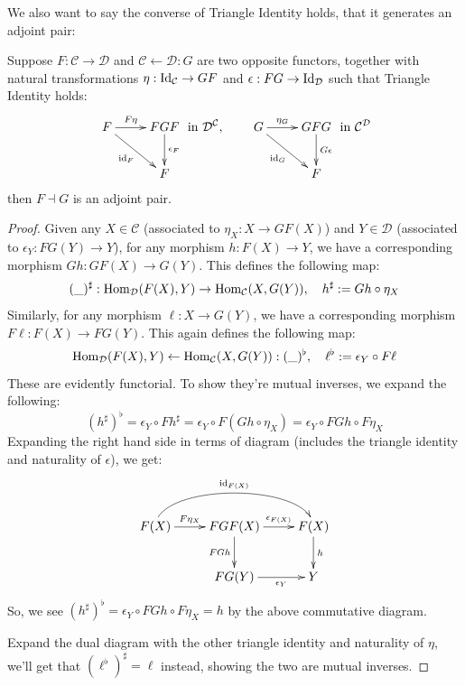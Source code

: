 \documentclass{article}
\begin{document}
We also want to say the converse of Triangle Identity holds, that it generates an adjoint pair:
\begin{lem}
    Suppose $F:\mathcal{C}\rightarrow \mathcal{D}$ and $\mathcal{C}\leftarrow \mathcal{D}:G$ are two opposite functors, together with natural transformations $\eta:\mathrm{Id}_\mathcal{C}\rightarrow GF$ and $\epsilon:FG\rightarrow \mathrm{Id}_\mathcal{D}$ such that Triangle Identity holds:
    \[\xymatrix{
        F \ar[r]^-{F\eta} \ar[dr]_-{\id_F} & FGF \ar[d]^-{\epsilon_F}\\
        & F
    } \text{ in }\mathcal{D}^\mathcal{C},\quad \quad \xymatrix{
        G \ar[r]^-{\eta_G} \ar[dr]_-{\id_G} & GFG \ar[d]^-{G\epsilon}\\
        & F
    } \text{ in }\mathcal{C}^\mathcal{D}\]
    then $F\dashv G$ is an adjoint pair.
\end{lem}
\begin{proof}
    Given any $X\in \mathcal{C}$ (associated to $\eta_X:X\rightarrow GF(X)$) and $Y\in\mathcal{D}$ (associated to $\epsilon_Y:FG(Y)\rightarrow Y$), for any morphism $h:F(X)\rightarrow Y$, we have a corresponding morphism $Gh:GF(X)\rightarrow G(Y)$. This defines the following map:
    \[(\_)^\sharp:\mathrm{Hom}_\mathcal{D}(F(X),Y)\rightarrow \mathrm{Hom}_\mathcal{C}(X,G(Y)),\quad h^\sharp := Gh\circ \eta_X\]
    Similarly, for any morphism $\ell:X\rightarrow G(Y)$, we have a corresponding morphism $F\ell:F(X)\rightarrow FG(Y)$. This again defines the following map:
    \[\mathrm{Hom}_\mathcal{D}(F(X),Y)\leftarrow \mathrm{Hom}_\mathcal{C}(X,G(Y)):(\_)^\flat,\quad \ell^\flat := \epsilon_Y\circ F\ell\]
    These are evidently functorial. To show they're mutual inverses, we expand the following:
    \[(h^\sharp)^\flat = \epsilon_Y\circ Fh^\sharp = \epsilon_Y\circ F(Gh\circ \eta_X) = \epsilon_Y \circ FGh\circ F\eta_X\]
    Expanding the right hand side in terms of diagram (includes the triangle identity and naturality of $\epsilon$), we get:
    \[\xymatrix{
        F(X) \ar@(u,u)[rr]^-{\id_{F(X)}} \ar[r]^-{F\eta_X} & FGF(X) \ar[d]_-{FGh} \ar[r]^-{\epsilon_{F(X)}} & F(X)\ar[d]^-{h}\\
        & FG(Y) \ar[r]_-{\epsilon_{Y}} & Y
    }\]
    So, we see $(h^\sharp)^\flat = \epsilon_Y\circ FGh\circ F\eta_X = h$ by the above commutative diagram.

    Expand the dual diagram with the other triangle identity and naturality of $\eta$, we'll get that $(\ell^\flat)^\sharp = \ell$ instead, showing the two are mutual inverses.
\end{proof}
\end{document}
